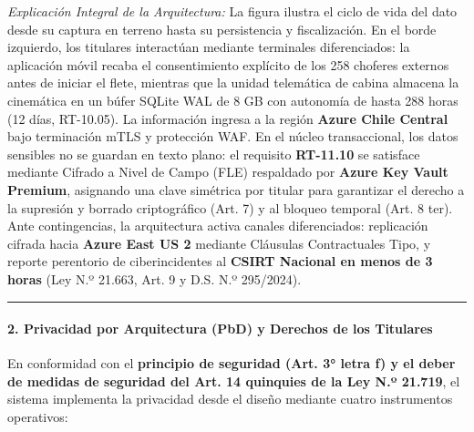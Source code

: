 \emph{Explicación Integral de la Arquitectura:} La figura ilustra el ciclo de vida del dato desde su captura en terreno hasta su persistencia y fiscalización. En el borde izquierdo, los titulares interactúan mediante terminales diferenciados: la aplicación móvil recaba el consentimiento explícito de los 258 choferes externos antes de iniciar el flete, mientras que la unidad telemática de cabina almacena la cinemática en un búfer SQLite WAL de 8 GB con autonomía de hasta 288 horas (12 días, RT-10.05). La información ingresa a la región \textbf{Azure Chile Central} bajo terminación mTLS y protección WAF. En el núcleo transaccional, los datos sensibles no se guardan en texto plano: el requisito \textbf{RT-11.10} se satisface mediante Cifrado a Nivel de Campo (FLE) respaldado por \textbf{Azure Key Vault Premium}, asignando una clave simétrica por titular para garantizar el derecho a la supresión y borrado criptográfico (Art. 7) y al bloqueo temporal (Art. 8 ter). Ante contingencias, la arquitectura activa canales diferenciados: replicación cifrada hacia \textbf{Azure East US 2} mediante Cláusulas Contractuales Tipo, y reporte perentorio de ciberincidentes al \textbf{CSIRT Nacional en menos de 3 horas} (Ley N.º 21.663, Art. 9 y D.S. N.º 295/2024).

\begin{center}\rule{0.5\linewidth}{0.5pt}\end{center}

\paragraph{2. Privacidad por Arquitectura (PbD) y Derechos de los Titulares}\label{privacidad-por-arquitectura-pbd-y-derechos-de-los-titulares}

En conformidad con el \textbf{principio de seguridad (Art. 3° letra f) y el deber de medidas de seguridad del Art. 14 quinquies de la Ley N.º 21.719}, el sistema implementa la privacidad desde el diseño mediante cuatro instrumentos operativos:

